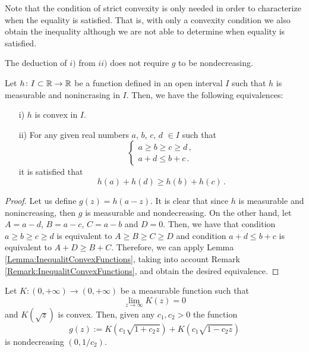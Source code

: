 \begin{remark}
\label{Remark:InequalitConvexFunctions}
Note that the condition of strict convexity is only needed in order to characterize when the equality is satisfied. That is, with only a convexity condition we also obtain the inequality although we are not able to determine when equality is satisfied.
\end{remark}
\begin{remark}
\label{Remark:LeftImplicationDoNotRequireNondecreasing}
The deduction of $i)$ from $ii)$ does not require $g$ to be nondecreasing.
\end{remark}

\begin{corollary}
\label{Cor:hDecreasingConvex}
Let $h \colon I\subset \mathbb{R} \to \mathbb{R}$ be a function defined in an open interval $I$ such that $h$ is measurable and nonincrasing in $I$. Then, we have the following equivalences:
\begin{enumerate}
\item[i)] $h$ is convex in $I$.
\item[ii)] For any given real numbers $a$, $b$, $c$, $d$ $\in I$ such that
\begin{equation}
\label{Eq:AssumptionsInequalitiesABCD}
\begin{cases}
a \geq b \geq c \geq d \,, \\
a + d \leq b + c\,.
\end{cases}
\end{equation}
it is satisfied that
$$ h(a) + h(d) \geq h(b) + h(c)\,.$$
\end{enumerate}
\end{corollary}

\begin{proof}
Let us define $g(z) = h(a-z)$. It is clear that since $h$ is measurable and nonincreasing, then $g$ is measurable and nondecreasing.
On the other hand, let $A=a-d$, $B=a-c$, $C=a-b$ and $D=0$. Then, we have that condition $a \geq b \geq c \geq d$ is equivalent to $A\geq B \geq C \geq D$ and condition $a+d\leq b+c$ is equivalent to $A+D\geq B+C$.
Therefore, we can apply Lemma \ref{Lemma:InequalitConvexFunctions}, taking into account Remark \ref{Remark:InequalitConvexFunctions}, and obtain the desired equivalence.
\end{proof}


\begin{lemma}
\label{Lemma:gNondecreasing}
Let $K:(0,+\infty) \to (0,+\infty)$ be a measurable function such that
$$ \lim_{z\to\infty} K(z) = 0 $$
and $ K(\sqrt{z}) $ is convex. Then, given any $c_1,c_2>0$ the function
$$
g(z) := K(c_1 \sqrt{1 + c_2 z}) +  K(c_1 \sqrt{1 - c_2 z})
$$
is nondecreasing $(0, 1/c_2)$.
\end{lemma}

